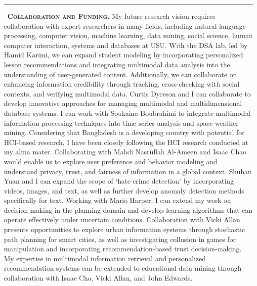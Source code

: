 \noindent\rule{2cm}{4pt}~\textbf{\textsc{Collaboration and Funding.}}
My future research vision requires collaboration with expert researchers in many
fields, including natural language processing, computer vision, machine learning, data mining, social science, human computer interaction, systems and databases at USU. 
With the DSA lab, led by Hamid Karimi, we can expand student modeling by incorporating personalized lesson recommendations and integrating multimodal data analysis into the understanding of user-generated content. Additionally, we can collaborate on enhancing information credibility through tracking, cross-checking with social contexts, and verifying multimodal data.
%
Curtis Dyreson and I can collaborate to develop innovative approaches for managing multimodal and multidimensional database systems.
%
I can work with Soukaina Boubrahimi to integrate multimodal information processing techniques into time series analysis and space weather mining.
%
Considering that Bangladesh is a developing country with potential for HCI-based research, I have been closely following the HCI research conducted at my alma mater. Collaborating with Mahdi Nasrullah Al-Ameen and Isaac Chao would enable us to explore user preference and behavior modeling and understand privacy, trust, and fairness of information in a global context.
%
Shuhan Yuan and I can expand the scope of `hate crime detection' by incorporating videos, images, and text, as well as further develop anomaly detection methods specifically for text.
%
Working with Mario Harper, I can extend my work on decision making in the planning domain and develop learning algorithms that can operate effectively under uncertain conditions.
%
Collaboration with Vicki Allan presents opportunities to explore urban information systems through stochastic path planning for smart cities, as well as investigating collusion in games for manipulation and incorporating recommendation-based trust decision-making.
%
My expertise in multimodal information retrieval and personalized recommendation systems can be extended to educational data mining through collaboration with Isaac Cho, Vicki Allan, and John Edwards.
%




